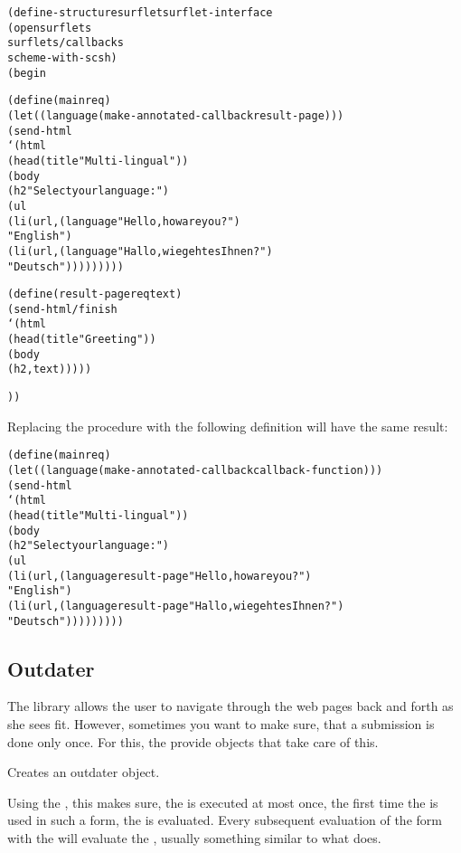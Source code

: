 \begin{alltt}
(define-structure surflet surflet-interface
  (open surflets
        surflets/callbacks
        scheme-with-scsh)
  (begin
    
    (define (main req)
      (let ((language (make-annotated-callback result-page)))
        (send-html
         `(html 
           (head (title "Multi-lingual"))
           (body 
            (h2 "Select your language:")
            (ul
             (li (url ,(language "Hello, how are you?") 
                      "English")
             (li (url ,(language "Hallo, wie geht es Ihnen?")
                      "Deutsch")))))))))

    (define (result-page req text)
      (send-html/finish
       `(html 
         (head (title "Greeting"))
         (body
          (h2 ,text)))))
                        
    ))
\end{alltt}


Replacing the  procedure with the following definition will
  have the same result:

\begin{alltt}
    (define (main req)
      (let ((language (make-annotated-callback  callback-function)))
        (send-html
         `(html 
           (head (title "Multi-lingual"))
           (body 
            (h2 "Select your language:")
            (ul
             (li (url ,(language result-page "Hello, how are you?") 
                      "English")
             (li (url ,(language result-page "Hallo, wie geht es Ihnen?")
                      "Deutsch")))))))))
\end{alltt}


\subsection{Outdater}

The \surflets library allows the user to navigate through the web
  pages back and forth as she sees fit.  However, sometimes you want
  to make sure, that a submission is done only once.  For this, the
  \surflets provide  objects that take care of this.

\begin{desc}
  Creates an outdater object.
\end{desc}

\begin{desc}
  Using the , this makes sure, the
   is executed at most once, \ie the first time
  the  is used in such a form, the
   is evaluated.  Every subsequent evaluation of
  the  form with the  will evaluate
  the , usually something similar to what
   does.
\end{desc}

